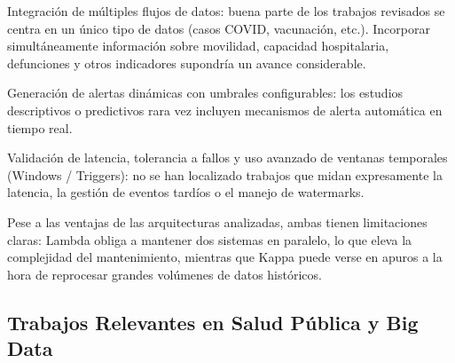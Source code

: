 \documentclass[12pt,a4paper]{article}
\begin{document}
Integración de múltiples flujos de datos: buena parte de los trabajos revisados se centra en un único tipo de datos (casos COVID, vacunación, etc.). Incorporar simultáneamente información sobre movilidad, capacidad hospitalaria, defunciones y otros indicadores supondría un avance considerable.

Generación de alertas dinámicas con umbrales configurables: los estudios descriptivos o predictivos rara vez incluyen mecanismos de alerta automática en tiempo real.

Validación de latencia, tolerancia a fallos y uso avanzado de ventanas temporales (Windows / Triggers): no se han localizado trabajos que midan expresamente la latencia, la gestión de eventos tardíos o el manejo de watermarks.

Pese a las ventajas de las arquitecturas analizadas, ambas tienen limitaciones claras: Lambda obliga a mantener dos sistemas en paralelo, lo que eleva la complejidad del mantenimiento, mientras que Kappa puede verse en apuros a la hora de reprocesar grandes volúmenes de datos históricos.

\subsection{Trabajos Relevantes en Salud Pública y Big Data}
\end{document}

